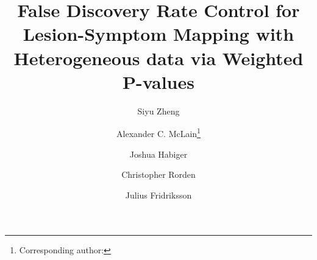 \documentclass[bimj,fleqn]{w-art}
\theoremstyle{plain}
\theoremstyle{definition}
\begin{document}
\DOIsuffix{}
\Volume{}
\Issue{}

\title[Weighted FDR Control for VLSM]{False Discovery Rate Control for Lesion-Symptom Mapping with Heterogeneous data via Weighted P-values}

\author[Zheng {\it{et al.}}]{Siyu Zheng} 
\address[\inst{1}]{Department of Epidemiology and Biostatistics, University of South Carolina, SC, United States}

\author[]{Alexander C. McLain\footnote{Corresponding author: {}}}

\author[]{Joshua Habiger}

\author[]{Christopher Rorden}

\author[]{Julius Fridriksson}

\address[\inst{2}]{Department of Statistics, Oklahoma State University, OK, United States}

\address[\inst{3}]{Department of Psychology, University of South Carolina, SC, United States}

\address[\inst{4}]{Department of Communication Sciences and Disorders, University of South Carolina, SC, United States}

  
\end{document}

